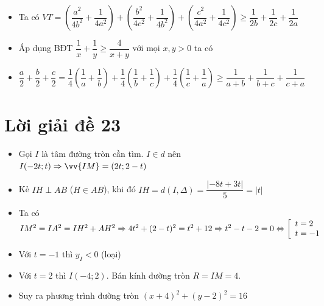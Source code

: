 \lgi 
\begin{itemize}[label=,leftmargin=*]
\item Ta có $VT=\left(\dfrac{a^2}{4b^2}+\dfrac{1}{4a^2}\right)+\left(\dfrac{b^2}{4c^2}+ \dfrac{1}{4b^2}\right)+\left(\dfrac{c^2}{4a^2}+\dfrac{1}{4c^2}\right)\ge \dfrac{1}{2b}+\dfrac{1}{2c}+\dfrac{1}{2a}$
\item Áp dụng BĐT $\dfrac{1}{x}+\dfrac{1}{y}\ge \dfrac{4}{x+y}$ với mọi $x,y>0$ ta có 
\item $\dfrac{a}{2}+\dfrac{b}{2}+\dfrac{c}{2}=\dfrac{1}{4}\left(\dfrac{1}{a}+\dfrac{1}{b} \right)+\dfrac{1}{4}\left(\dfrac{1}{b}+\dfrac{1}{c} \right)+\dfrac{1}{4}\left(\dfrac{1}{c}+\dfrac{1}{a} \right)\ge \dfrac{1}{a+b}+\dfrac{1}{b+c}+\dfrac{1}{c+a}$
\end{itemize}

\section{Lời giải đề 23}
\lgi 
\begin{itemize}[label=,leftmargin=*]
\item Gọi $I$ là tâm đường tròn cần tìm. $I \in d$ nên $I(-2t;t)\Rightarrow \vv{IM}=(2t;2-t)$
\item Kẻ $IH\perp AB$ ($H\in AB$), khi đó $IH=d(I,\Delta)=\dfrac{|-8t+3t|}{5}=|t|$
\item Ta có $IM^2=IA^2=IH^2+AH^2\Rightarrow 4t^2+(2-t)^2=t^2+12 \Rightarrow t^2-t-2=0 \Leftrightarrow \left[\begin{array}{ll}t=2 \\ t=-1\end{array}\right.$
\item Với $t=-1$ thì $y_I<0$ (loại)
\item Với $t=2$ thì $I(-4;2)$. Bán kính đường tròn $R=IM=4$. 
\item Suy ra phương trình đường tròn $(x+4)^2+(y-2)^2=16$
\end{itemize}

